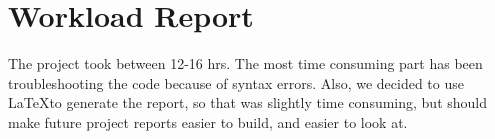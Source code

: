 \documentclass[12pt, oneside]{article}
\begin{document}
\section{Workload Report}
The project took between 12-16 hrs. The most time consuming part has been troubleshooting the code because of syntax errors. Also, we decided to use \LaTeX to generate the report, so that was slightly time consuming, but should make future project reports easier to build, and easier to look at.\par
\end{document}
